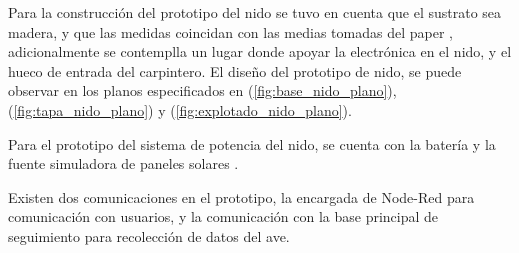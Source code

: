 %

Para la construcción del prototipo del nido se tuvo en cuenta que el sustrato sea madera, y que las medidas coincidan con las medias tomadas del paper \cite{ref:varepsilon_madera}, adicionalmente se contemplla un lugar donde apoyar la electrónica en el nido, y el hueco de entrada del carpintero.
El diseño del prototipo de nido, se puede observar en los planos especificados en (\ref{fig:base_nido_plano}), (\ref{fig:tapa_nido_plano}) y (\ref{fig:explotado_nido_plano}).
\TBC
{}
\TBC

Para el prototipo del sistema de potencia del nido, se cuenta con la batería \TBC y la fuente simuladora de paneles solares \TBC.

Existen dos comunicaciones en el prototipo, la encargada de Node-Red para comunicación con usuarios, y la comunicación con la base principal de seguimiento para recolección de datos del ave.

